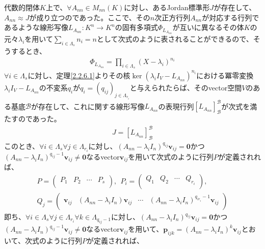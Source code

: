 \documentclass[dvipdfmx]{jsarticle}
\begin{document}
\begin{thm}\label{2.2.8.20}
代数的閉体$K$上で、$\forall A_{nn} \in M_{nn}(K)$に対し、あるJordan標準形$J$が存在して、$A_{nn} \approx J$が成り立つのであった。ここで、その$n$次正方行列$A_{nn}$が対応する行列であるような線形写像$L_{A_{nn}}:K^{n} \rightarrow K^{n}$の固有多項式$\varPhi_{L_{A_{nn}}}$が互いに異なるその体$K$の元々$\lambda_{i}$を用いて$\sum_{i \in \varLambda_{s}} n_{i} = n$として次式のように表されることができるので、そうするとき、
\begin{align*}
\varPhi_{L_{A_{nn}}} = \prod_{i \in \varLambda_{s}} \left( X - \lambda_{i} \right)^{n_{i}}
\end{align*}
$\forall i \in \varLambda_{s}$に対し、定理\ref{2.2.6.1}よりその核$\ker\left( \lambda_{i}I_{V} - L_{A_{nn}} \right)^{n_{i}}$における冪零変換$\lambda_{i}I_{V} - L_{A_{nn}}$の不変系$q_{i}$が$q_{i} = \left( q_{ij} \right)_{j \in \varLambda_{r_{i}}}$と与えられたらば、そのvector空間$V$のある基底$\mathcal{B}$が存在して、これに関する線形写像$L_{A_{nn}}$の表現行列$\left[ L_{A_{nn}} \right]_{\mathcal{B}}^{\mathcal{B}}$が次式を満たすのであった。
\begin{align*}
J = \left[ L_{A_{nn}} \right]_{\mathcal{B}}^{\mathcal{B}}
\end{align*}
このとき、$\forall i \in \varLambda_{s}\forall j \in \varLambda_{r_{i}}$に対し、$\left( A_{nn} - \lambda_{i}I_{n} \right)^{q_{ij}}\mathbf{v}_{ij} = \mathbf{0}$かつ$\left( A_{nn} - \lambda_{i}I_{n} \right)^{q_{ij} - 1}\mathbf{v}_{ij} \neq \mathbf{0}$なるvector$\mathbf{v}_{ij}$を用いて次式のように行列$P$が定義されれば、
\begin{align*}
P = \begin{pmatrix}
P_{1} & P_{2} & \cdots & P_{s} \\
\end{pmatrix},\ \ P_{i} = \begin{pmatrix}
Q_{1} & Q_{2} & \cdots & Q_{r_{i}} \\
\end{pmatrix},\\
Q_{j} = \begin{pmatrix}
\mathbf{v}_{ij} & \left( A_{nn} - \lambda_{i}I_{n} \right)\mathbf{v}_{ij} & \cdots & \left( A_{nn} - \lambda_{i}I_{n} \right)^{q_{ir_{i}} - 1}\mathbf{v}_{ij} \\
\end{pmatrix}
\end{align*}
即ち、$\forall i \in \varLambda_{s}\forall j \in \varLambda_{r_{i}}\forall k \in \varLambda_{q_{ij} - 1}$に対し、$\left( A_{nn} - \lambda_{i}I_{n} \right)^{q_{ij}}\mathbf{v}_{ij} = \mathbf{0}$かつ$\left( A_{nn} - \lambda_{i}I_{n} \right)^{q_{ij} - 1}\mathbf{v}_{ij} \neq \mathbf{0}$なるvector$\mathbf{v}_{ij}$を用いて、$\mathbf{p}_{ijk} = \left( A_{nn} - \lambda_{i}I_{n} \right)^{k}\mathbf{v}_{ij}$とおいて、次式のように行列$P$が定義されれば、

\end{thm}
\end{document}
